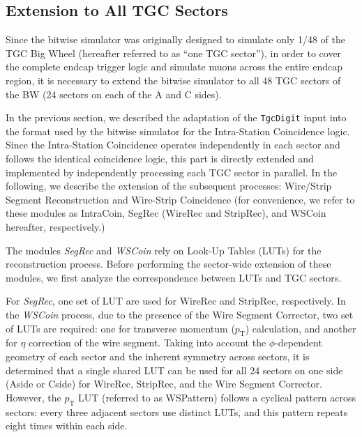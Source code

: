 \subsection{Extension to All TGC Sectors} \label{subsec:Extension}
Since the bitwise simulator was originally designed to simulate only 1/48 of the TGC Big Wheel (hereafter referred to as ``one TGC sector''), in order to cover the complete endcap trigger logic and simulate muons across the entire endcap region, it is necessary to extend the bitwise simulator to all 48 TGC sectors of the BW (24 sectors on each of the A and C sides).

In the previous section, we described the adaptation of the \texttt{TgcDigit} input into the format used by the bitwise simulator for the Intra-Station Coincidence logic. Since the Intra-Station Coincidence operates independently in each sector and follows the identical coincidence logic, this part is directly extended and implemented by independently processing each TGC sector in parallel. In the following, we describe the extension of the subsequent processes: Wire/Strip Segment Reconstruction and Wire-Strip Coincidence (for convenience, we refer to these modules as IntraCoin, SegRec (WireRec and StripRec), and WSCoin hereafter, respectively.)

The modules \textit{SegRec} and \textit{WSCoin} rely on Look-Up Tables (LUTs) for the reconstruction process. Before performing the sector-wide extension of these modules, we first analyze the correspondence between LUTs and TGC sectors.

For \textit{SegRec}, one set of LUT are used for WireRec and StripRec, respectively. In the \textit{WSCoin} process, due to the presence of the Wire Segment Corrector, two set of LUTs are required: one for transverse momentum ($p_\mathrm{T}$) calculation, and another for $\eta$ correction of the wire segment. Taking into account the $\phi$-dependent geometry of each sector and the inherent symmetry across sectors, it is determined that a single shared LUT can be used for all 24 sectors on one side (Aside or Cside) for WireRec, StripRec, and the Wire Segment Corrector. However, the $p_\mathrm{T}$ LUT (referred to as WSPattern) follows a cyclical pattern across sectors: every three adjacent sectors use distinct LUTs, and this pattern repeats eight times within each side.

